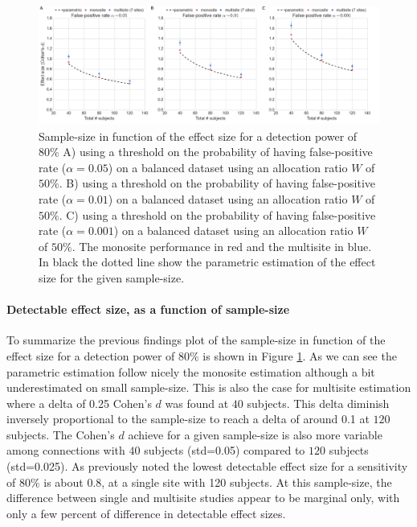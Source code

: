 \documentclass[authoryear]{elsarticle}
\begin{document}
\begin{figure}[tbp]
\centering
\includegraphics[width=\textwidth]{../figures/samplesize_x_effectsize.png}
\caption[]{
Sample-size in function of the effect size for a detection power of 80\%
A) using a threshold on the probability of having false-positive rate ($\alpha=0.05$) on a balanced dataset using an allocation ratio $W$ of $50\%$.
B) using a threshold on the probability of having false-positive rate ($\alpha=0.01$) on a balanced dataset using an allocation ratio $W$ of $50\%$.
C) using a threshold on the probability of having false-positive rate ($\alpha=0.001$) on a balanced dataset using an allocation ratio $W$ of $50\%$.
The monosite performance in red and the multisite in blue. In black the dotted line show the parametric estimation of the effect size for the given sample-size.
}
\label{fig_sampeffect_curves_alpha001}
\end{figure}

\paragraph{Detectable effect size, as a function of sample-size} To summarize the previous findings plot of the sample-size in function of the effect size for a detection power of $80\%$ is shown in Figure \ref{fig_sampeffect_curves_alpha001}. As we can see the parametric estimation follow nicely the monosite estimation although a bit underestimated on small sample-size. This is also the case for multisite estimation where a delta of 0.25 Cohen's $d$ was found at $40$ subjects. This delta diminish inversely proportional to the sample-size to reach a delta of around 0.1 at $120$ subjects. The Cohen's $d$ achieve for a given sample-size is also more variable among connections with $40$ subjects (std=0.05) compared to $120$ subjects (std=0.025). As previously noted the lowest detectable effect size for a sensitivity of $80\%$ is about 0.8, at a single site with 120 subjects. At this sample-size, the difference between single and multisite studies appear to be marginal only, with only a few percent of difference in detectable effect sizes. 
\end{document}
